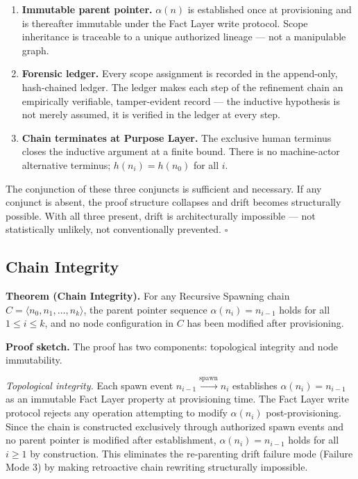 \begin{enumerate}
    \item[(1)] \textbf{Immutable parent pointer.} $\alpha(n)$ is established once at provisioning and is thereafter immutable under the Fact Layer write protocol. Scope inheritance is traceable to a unique authorized lineage — not a manipulable graph.
    \item[(2)] \textbf{Forensic ledger.} Every scope assignment is recorded in the append-only, hash-chained ledger. The ledger makes each step of the refinement chain an empirically verifiable, tamper-evident record — the inductive hypothesis is not merely assumed, it is verified in the ledger at every step.
    \item[(3)] \textbf{Chain terminates at Purpose Layer.} The exclusive human terminus closes the inductive argument at a finite bound. There is no machine-actor alternative terminus; $h(n_i) = h(n_0)$ for all $i$.
\end{enumerate}

The conjunction of these three conjuncts is sufficient and necessary. If any conjunct is absent, the proof structure collapses and drift becomes structurally possible. With all three present, drift is architecturally impossible — not statistically unlikely, not conventionally prevented. $\square$

\subsection{Chain Integrity}
\label{sec:rs-chain-integrity}

\medskip
\noindent\textbf{Theorem (Chain Integrity).} For any Recursive Spawning chain $C = \langle n_0, n_1, \ldots, n_k \rangle$, the parent pointer sequence $\alpha(n_i) = n_{i-1}$ holds for all $1 \leq i \leq k$, and no node configuration in $C$ has been modified after provisioning.

\medskip
\noindent\textbf{Proof sketch.} The proof has two components: topological integrity and node immutability.

\medskip
\textit{Topological integrity.} Each spawn event $n_{i-1} \xrightarrow{\text{spawn}} n_i$ establishes $\alpha(n_i) = n_{i-1}$ as an immutable Fact Layer property at provisioning time. The Fact Layer write protocol rejects any operation attempting to modify $\alpha(n_i)$ post-provisioning. Since the chain is constructed exclusively through authorized spawn events and no parent pointer is modified after establishment, $\alpha(n_i) = n_{i-1}$ holds for all $i \geq 1$ by construction. This eliminates the re-parenting drift failure mode (Failure Mode 3) by making retroactive chain rewriting structurally impossible.

